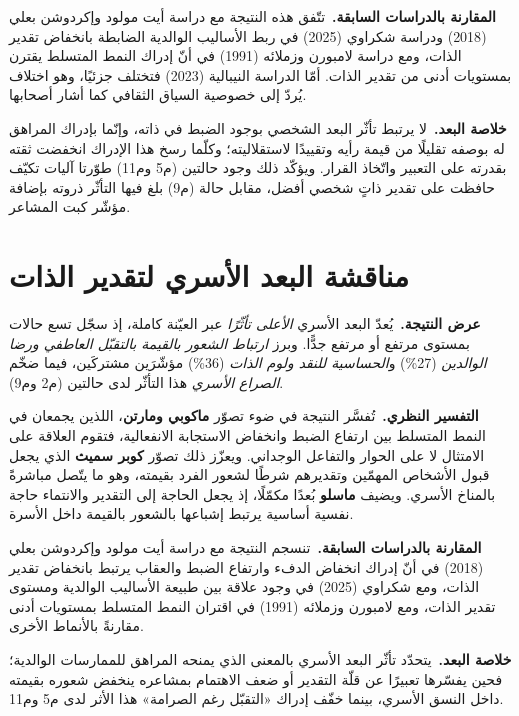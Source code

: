 \documentclass[12pt,oneside]{report}
\begin{document}
\noindent\textbf{المقارنة بالدراسات السابقة.}\ تتّفق هذه النتيجة مع دراسة أيت مولود وإكردوشن بعلي
(2018) ودراسة شكراوي (2025) في ربط الأساليب الوالدية الضابطة بانخفاض تقدير الذات، ومع دراسة
لامبورن وزملائه (1991) في أنّ إدراك النمط المتسلط يقترن بمستويات أدنى من تقدير الذات. أمّا
الدراسة النيبالية (2023) فتختلف جزئيًا، وهو اختلاف يُردّ إلى خصوصية السياق الثقافي كما أشار
أصحابها.

\noindent\textbf{خلاصة البعد.}\ لا يرتبط تأثّر البعد الشخصي بوجود الضبط في ذاته، وإنّما بإدراك
المراهق له بوصفه تقليلًا من قيمة رأيه وتقييدًا لاستقلاليته؛ وكلّما رسخ هذا الإدراك انخفضت ثقته
بقدرته على التعبير واتّخاذ القرار. ويؤكّد ذلك وجود حالتين (م5 وم11) طوّرتا آليات تكيّف حافظت على
تقدير ذاتٍ شخصي أفضل، مقابل حالة (م9) بلغ فيها التأثّر ذروته بإضافة مؤشّر كبت المشاعر.

\section{مناقشة البعد الأسري لتقدير الذات}
\noindent\textbf{عرض النتيجة.}\ يُعدّ البعد الأسري \emph{الأعلى تأثّرًا} عبر العيّنة كاملة، إذ
سجّل تسع حالات بمستوى مرتفع أو مرتفع جدًّا. وبرز \emph{ارتباط الشعور بالقيمة بالتقبّل العاطفي
ورضا الوالدين} (27\%) و\emph{الحساسية للنقد ولوم الذات} (36\%) مؤشّرَين مشتركَين، فيما ضخّم
\emph{الصراع الأسري} هذا التأثّر لدى حالتين (م2 وم9).

\noindent\textbf{التفسير النظري.}\ تُفسَّر النتيجة في ضوء تصوّر \textbf{ماكوبي ومارتن}، اللذين
يجمعان في النمط المتسلط بين ارتفاع الضبط وانخفاض الاستجابة الانفعالية، فتقوم العلاقة على الامتثال
لا على الحوار والتفاعل الوجداني. ويعزّز ذلك تصوّر \textbf{كوبر سميث} الذي يجعل قبول الأشخاص
المهمّين وتقديرهم شرطًا لشعور الفرد بقيمته، وهو ما يتّصل مباشرةً بالمناخ الأسري. ويضيف
\textbf{ماسلو} بُعدًا مكمّلًا، إذ يجعل الحاجة إلى التقدير والانتماء حاجة نفسية أساسية يرتبط
إشباعها بالشعور بالقيمة داخل الأسرة.

\noindent\textbf{المقارنة بالدراسات السابقة.}\ تنسجم النتيجة مع دراسة أيت مولود وإكردوشن بعلي
(2018) في أنّ إدراك انخفاض الدفء وارتفاع الضبط والعقاب يرتبط بانخفاض تقدير الذات، ومع شكراوي
(2025) في وجود علاقة بين طبيعة الأساليب الوالدية ومستوى تقدير الذات، ومع لامبورن وزملائه (1991)
في اقتران النمط المتسلط بمستويات أدنى مقارنةً بالأنماط الأخرى.

\noindent\textbf{خلاصة البعد.}\ يتحدّد تأثّر البعد الأسري بالمعنى الذي يمنحه المراهق للممارسات
الوالدية؛ فحين يفسّرها تعبيرًا عن قلّة التقدير أو ضعف الاهتمام بمشاعره ينخفض شعوره بقيمته داخل
النسق الأسري، بينما خفّف إدراك «التقبّل رغم الصرامة» هذا الأثر لدى م5 وم11.
\end{document}
